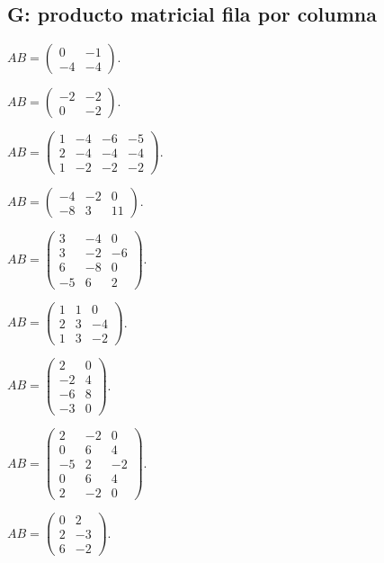 \documentclass[12pt]{article}
\theoremstyle{remark}
\begin{document}
\subsection*{G: producto matricial fila por columna}
\begin{description}[style=nextline,leftmargin=3em,itemsep=0.45em]
\item[E113.] $AB=\begin{pmatrix}0&-1\\-4&-4\end{pmatrix}$.
\item[E114.] $AB=\begin{pmatrix}-2&-2\\0&-2\end{pmatrix}$.
\item[E115.] $AB=\begin{pmatrix}1&-4&-6&-5\\2&-4&-4&-4\\1&-2&-2&-2\end{pmatrix}$.
\item[E116.] $AB=\begin{pmatrix}-4&-2&0\\-8&3&11\end{pmatrix}$.
\item[E117.] $AB=\begin{pmatrix}3&-4&0\\3&-2&-6\\6&-8&0\\-5&6&2\end{pmatrix}$.
\item[E118.] $AB=\begin{pmatrix}1&1&0\\2&3&-4\\1&3&-2\end{pmatrix}$.
\item[E119.] $AB=\begin{pmatrix}2&0\\-2&4\\-6&8\\-3&0\end{pmatrix}$.
\item[E120.] $AB=\begin{pmatrix}2&-2&0\\0&6&4\\-5&2&-2\\0&6&4\\2&-2&0\end{pmatrix}$.
\item[E121.] $AB=\begin{pmatrix}0&2\\2&-3\\6&-2\end{pmatrix}$.

\end{description}
\end{document}
